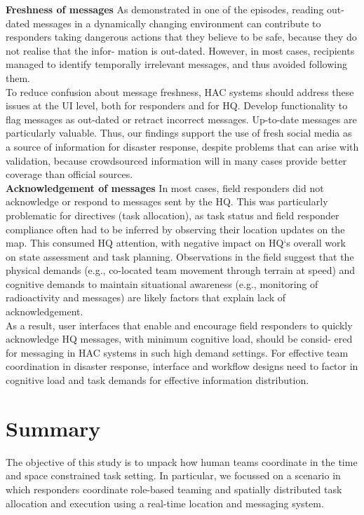 \textbf{Freshness of messages} As demonstrated in one of the episodes, reading out-dated messages in a dynamically changing environment can contribute to responders taking dangerous actions that they believe to be safe, because they do not realise that the infor- mation is out-dated. However, in most cases, recipients managed to identify temporally irrelevant messages, and thus avoided following them.\\

To reduce confusion about message freshness, HAC systems should address these issues at the UI level, both for responders and for HQ. Develop functionality to flag messages as out-dated or retract incorrect messages. Up-to-date messages are particularly valuable. Thus, our findings support the use of fresh social media as a source of information for disaster response, despite problems that can arise with validation, because crowdsourced information will in many cases provide better coverage than official sources.\\

\textbf{Acknowledgement of messages} In most cases, field responders did not acknowledge or respond to messages sent by the HQ. This was particularly problematic for directives (task allocation), as task status and field responder compliance often had to be inferred by observing their location updates on the map. This consumed HQ attention, with negative impact on HQ`s overall work on state assessment and task planning. Observations in the field suggest that the physical demands (e.g., co-located team movement through terrain at speed) and cognitive demands to maintain situational awareness (e.g., monitoring of radioactivity and messages) are likely factors that explain lack of acknowledgement.\\

As a result, user interfaces that enable and encourage field responders to quickly acknowledge HQ messages, with minimum cognitive load, should be consid- ered for messaging in HAC systems in such high demand settings. For effective team coordination in disaster response, interface and workflow designs need to factor in cognitive load and task demands for effective information distribution.\\


\section{Summary}
The objective of this study is to unpack how human teams coordinate in the time and space constrained task setting. In particular, we focussed on a scenario in which responders coordinate role-based teaming and spatially distributed task allocation and execution using a real-time location and messaging system.\\

